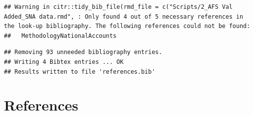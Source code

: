 \documentclass[
]{article}
\begin{document}
\begin{verbatim}
## Warning in citr::tidy_bib_file(rmd_file = c("Scripts/2_AFS Val Added_SNA data.rmd", : Only found 4 out of 5 necessary references in the look-up bibliography. The following references could not be found:
##   MethodologyNationalAccounts
\end{verbatim}

\begin{verbatim}
## Removing 93 unneeded bibliography entries.
## Writing 4 Bibtex entries ... OK
## Results written to file 'references.bib'
\end{verbatim}

\hypertarget{references}{%
\section{References}\label{references}}
\end{document}
